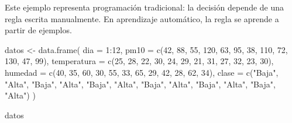 \documentclass[
  spanish,
  11pt,
  letterpaper,
]{book}
\newenvironment{Shaded}{}{}
\newcommand{\AttributeTok}[1]{\textcolor[rgb]{0.84,0.23,0.29}{#1}}
\newcommand{\DecValTok}[1]{\textcolor[rgb]{0.00,0.36,0.77}{#1}}
\newcommand{\FunctionTok}[1]{\textcolor[rgb]{0.44,0.26,0.76}{#1}}
\newcommand{\NormalTok}[1]{\textcolor[rgb]{0.14,0.16,0.18}{#1}}
\newcommand{\OtherTok}[1]{\textcolor[rgb]{0.44,0.26,0.76}{#1}}
\newcommand{\SpecialCharTok}[1]{\textcolor[rgb]{0.00,0.36,0.77}{#1}}
\newcommand{\StringTok}[1]{\textcolor[rgb]{0.01,0.18,0.38}{#1}}
\begin{document}
\begin{tcolorbox}[enhanced jigsaw, arc=.35mm, bottomrule=.15mm, bottomtitle=1mm, breakable, colback=white, colbacktitle=quarto-callout-tip-color!10!white, colframe=quarto-callout-tip-color-frame, coltitle=black, left=2mm, leftrule=.75mm, opacityback=0, opacitybacktitle=0.6, rightrule=.15mm, title=\textcolor{quarto-callout-tip-color}{\faLightbulb}\hspace{0.5em}{Interpretación del resultado}, titlerule=0mm, toprule=.15mm, toptitle=1mm]

Este ejemplo representa programación tradicional: la decisión depende de
una regla escrita manualmente. En aprendizaje automático, la regla se
aprende a partir de ejemplos.

\end{tcolorbox}

\begin{Shaded}
\begin{Highlighting}[]
\NormalTok{datos }\OtherTok{\textless{}{-}} \FunctionTok{data.frame}\NormalTok{(}
  \AttributeTok{dia =} \DecValTok{1}\SpecialCharTok{:}\DecValTok{12}\NormalTok{,}
  \AttributeTok{pm10 =} \FunctionTok{c}\NormalTok{(}\DecValTok{42}\NormalTok{, }\DecValTok{88}\NormalTok{, }\DecValTok{55}\NormalTok{, }\DecValTok{120}\NormalTok{, }\DecValTok{63}\NormalTok{, }\DecValTok{95}\NormalTok{, }\DecValTok{38}\NormalTok{, }\DecValTok{110}\NormalTok{, }\DecValTok{72}\NormalTok{, }\DecValTok{130}\NormalTok{, }\DecValTok{47}\NormalTok{, }\DecValTok{99}\NormalTok{),}
  \AttributeTok{temperatura =} \FunctionTok{c}\NormalTok{(}\DecValTok{25}\NormalTok{, }\DecValTok{28}\NormalTok{, }\DecValTok{22}\NormalTok{, }\DecValTok{30}\NormalTok{, }\DecValTok{24}\NormalTok{, }\DecValTok{29}\NormalTok{, }\DecValTok{21}\NormalTok{, }\DecValTok{31}\NormalTok{, }\DecValTok{27}\NormalTok{, }\DecValTok{32}\NormalTok{, }\DecValTok{23}\NormalTok{, }\DecValTok{30}\NormalTok{),}
  \AttributeTok{humedad =} \FunctionTok{c}\NormalTok{(}\DecValTok{40}\NormalTok{, }\DecValTok{35}\NormalTok{, }\DecValTok{60}\NormalTok{, }\DecValTok{30}\NormalTok{, }\DecValTok{55}\NormalTok{, }\DecValTok{33}\NormalTok{, }\DecValTok{65}\NormalTok{, }\DecValTok{29}\NormalTok{, }\DecValTok{42}\NormalTok{, }\DecValTok{28}\NormalTok{, }\DecValTok{62}\NormalTok{, }\DecValTok{34}\NormalTok{),}
  \AttributeTok{clase =} \FunctionTok{c}\NormalTok{(}\StringTok{"Baja"}\NormalTok{, }\StringTok{"Alta"}\NormalTok{, }\StringTok{"Baja"}\NormalTok{, }\StringTok{"Alta"}\NormalTok{, }\StringTok{"Baja"}\NormalTok{, }\StringTok{"Alta"}\NormalTok{, }\StringTok{"Baja"}\NormalTok{, }\StringTok{"Alta"}\NormalTok{, }\StringTok{"Baja"}\NormalTok{, }\StringTok{"Alta"}\NormalTok{, }\StringTok{"Baja"}\NormalTok{, }\StringTok{"Alta"}\NormalTok{)}
\NormalTok{)}

\NormalTok{datos}
\end{Highlighting}
\end{Shaded}
\end{document}
